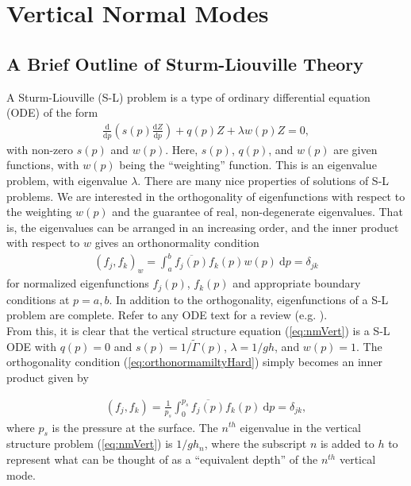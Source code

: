 \section{Vertical Normal Modes}
\subsection{A Brief Outline of Sturm-Liouville Theory}
A Sturm-Liouville (S-L) problem is a type of ordinary differential equation (ODE) of the form
\begin{align}
\frac{\text{d}}{\text{d} p} \left( s(p) \frac{\text{d} Z}{\text{d} p} \right) + q(p) Z + \lambda w(p) Z = 0, \label{eq:SturmLiouville}
\end{align}
with non-zero $s(p)$ and $w(p)$. Here, $s(p)$, $q(p)$, and $w(p)$ are given functions, with $w(p)$ being the ``weighting'' function. This is an eigenvalue problem, with eigenvalue $\lambda$. There are many nice properties of solutions of S-L problems. We are interested in the orthogonality of eigenfunctions with respect to the weighting $w(p)$ and the guarantee of real, non-degenerate eigenvalues. That is, the eigenvalues can be arranged in an increasing order, and the inner product with respect to $w$ gives an orthonormality condition 
\begin{align}
(f_j, f_k)_w = \int_a^b \overline{f_j(p)}f_k(p) w(p) ~\text{d}p = \delta_{jk} \label{eq:orthonormamiltyHard}
\end{align}
for normalized eigenfunctions $f_j(p)$, $f_k(p)$ and appropriate boundary conditions at $p=a,b$. In addition to the orthogonality, eigenfunctions of a S-L problem are complete. Refer to any ODE text for a review (e.g. \cite{Atkinson1964}).\\

From this, it is clear that the vertical structure equation (\ref{eq:nmVert}) is a S-L ODE with $q(p) = 0$ and $s(p) = 1/\tilde{\Gamma}(p)$, $\lambda = 1/gh$, and $w(p) = 1$. The orthogonality condition (\ref{eq:orthonormamiltyHard}) simply becomes an inner product given by

\begin{align}
(f_j, f_k) = \frac{1}{p_s} \int_0^{p_s} \overline{f_j(p)} f_k(p) ~\text{d}p = \delta_{jk},
\end{align}
where $p_s$ is the pressure at the surface. The $n^{th}$ eigenvalue in the vertical structure problem (\ref{eq:nmVert}) is $1/gh_n$, where the subscript $n$ is added to $h$ to represent what can be thought of as a ``equivalent depth'' \cite{Daley1991} of the $n^{th}$ vertical mode.\\

